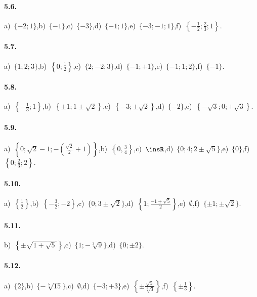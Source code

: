 \paragraph{5.6.} a)~$\{-2;1\}$,\quad b)~$\{-1\}$,\quad c)~$\{-3\}$,\quad d)~$\{-1;1\}$,\quad e)~$\{-3;-1;1\}$,\quad f)~$\left\{-\frac1 2;\frac 2 3;1\right\}$.

\paragraph{5.7.} a)~$\{1;2;3\}$,\quad b)~$\left\{0;\frac1 2\right\}$,\quad c)~$\{2;-2;3\}$,\quad d)~$\{-1;+1\}$,\quad e)~$\{-1;1;2\}$,\quad f)~$\{-1\}$.

\paragraph{5.8.} a)~$\left\{-\frac 1 3;1\right\}$,\quad b)~$\left\{\pm 1;1\pm \sqrt 2\right\}$,\quad c)~$\left\{-3;\pm \sqrt 2\right\}$,\quad d)~$\{-2\}$,\quad e)~$\left\{-\sqrt 3;0;+\sqrt 3\right\}$.

\paragraph{5.9.} a)~$\left\{0;\sqrt 2-1;-\left(\frac{\sqrt 2} 2+1\right)\right\}$,\quad b)~$\left\{0,\frac 3 4\right\}$,\quad c)~$\insR$,\quad d)~$\{0;4;2\pm \sqrt 5\}$,\quad e)~$\{0\}$,\quad f)~$\left\{0;\frac 2 3;2\right\}$.

\paragraph{5.10.} a)~$\left\{\frac 1 2\right\}$,\quad b)~$\left\{-\frac 3 2;-2\right\}$,\quad c)~$\{0;3\pm \sqrt 2\}$,\quad d)~$\left\{1;\frac{-1\pm \sqrt 5} 2\right\}$,\quad e)~$\emptyset $,\quad f)~$\{\pm 1;\pm \sqrt 2\}$.

\paragraph{5.11.} b)~$\left\{\pm \sqrt{1+\sqrt 5}\right\}$,\quad c)~$\{1;-\sqrt[3]9\}$,\quad d)~$\{0;\pm 2\}$.

\paragraph{5.12.} a)~$\{2\}$,\quad b)~$\{-\sqrt[5]{15}\}$,\quad c)~$\emptyset $,\quad d)~$\{-3;+3\}$,\quad e)~$\left\{\pm \frac{\sqrt 5}{\sqrt[6]3}\right\}$,\quad f)~$\left\{\pm \frac 1 3\right\}$.

